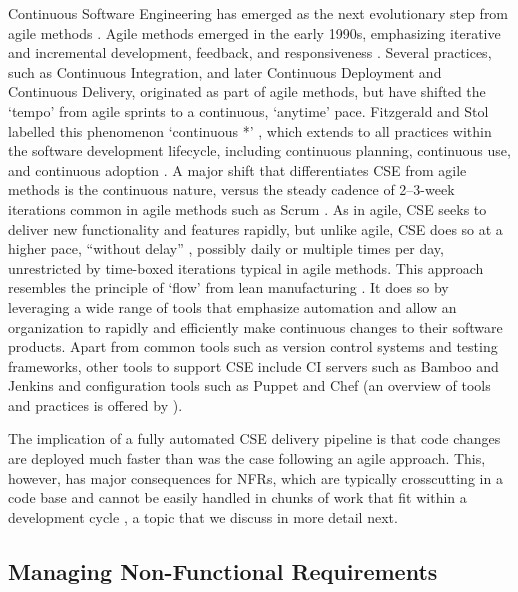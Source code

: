 \documentclass[smallextended]{svjour3}        %
\begin{document}
Continuous Software Engineering has emerged as the next evolutionary step from agile methods \citep{fitzgerald2017continuous,klotins2023continuous,bosch2014continuous}. Agile methods emerged in the early 1990s, emphasizing iterative and incremental development, feedback, and responsiveness \citep{tkalich2025user}. 
Several practices, such as Continuous Integration, and later Continuous Deployment and Continuous Delivery, originated as part of agile methods, but have shifted the `tempo' from agile sprints to a continuous, `anytime' pace. Fitzgerald and Stol labelled this phenomenon `continuous *' \citep{fitzgerald2017continuous}, which extends to all practices within the software development lifecycle, including continuous planning, continuous use, and continuous adoption \citep{barbala2024hicss}. 
A major shift that differentiates CSE from agile methods is the continuous nature, versus the steady cadence of 2--3-week iterations common in agile methods such as Scrum \citep{fitzgerald2017continuous,klotins2023continuous,tkalich2025user}. As in agile, CSE seeks to deliver new functionality and features rapidly, but unlike agile, CSE does so at a higher pace, ``without delay'' \citep{klotins2023continuous}, possibly daily or multiple times per day, unrestricted by time-boxed iterations typical in agile methods.
This approach resembles the principle of `flow' from lean manufacturing \citep{fitzgerald2017continuous}.
It does so by leveraging a wide range of tools that emphasize automation and allow an organization to rapidly and efficiently make continuous changes to their software products. Apart from common tools such as version control systems and testing frameworks, other tools to support CSE include CI servers such as Bamboo and Jenkins and configuration tools such as Puppet and Chef (an overview of tools and practices is offered by \citet{shahin2017continuous}). 

The implication of a fully automated CSE delivery pipeline is that code changes are deployed much faster than was the case following an agile approach. 
This, however, has major consequences for NFRs, which are typically crosscutting in a code base and cannot be easily handled in chunks of work that fit within a development cycle \citep{bellomo_evolutionary_2014}, a topic that we discuss in more detail next.




\subsection{Managing Non-Functional Requirements}
\label{sec:nfr}
\end{document}
